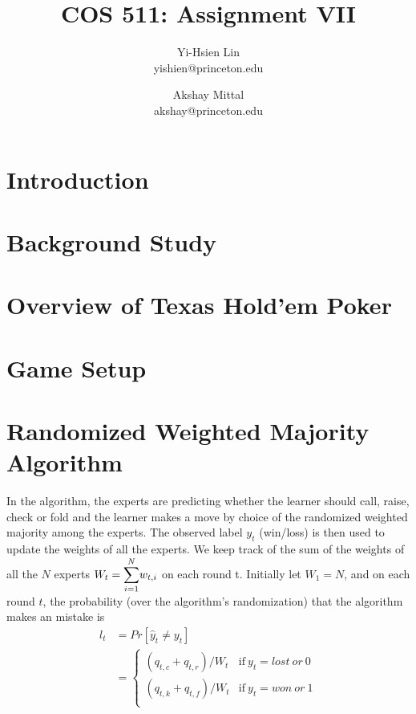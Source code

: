 \documentclass[12pt]{article}
\begin{document}
\title{COS 511: Assignment VII}
\author{
	Yi-Hsien Lin \\ yishien@princeton.edu \and
	Akshay Mittal \\ akshay@princeton.edu
}
\date{}

\maketitle

\section{Introduction}

\section{Background Study}

\section{Overview of Texas Hold'em Poker}

\section{Game Setup}

\section{Randomized Weighted Majority Algorithm}
\label{sec:rwma}
\noindent In the algorithm, the experts are predicting whether the learner should call, raise, check
or fold and the learner makes a move by choice of the randomized weighted majority
among the experts. The observed label $y_t$ (win/loss) is then used to update
the weights of all the experts. We keep track of the sum of the weights of all the $N$ experts $W_t =
\Sum_{i=1}^Nw_{t,i}$ on each round t. Initially let $W_1 = N$, and on each round $t$, the probability
(over the algorithm's randomization) that the algorithm makes an mistake is
\begin{align}
l_t &= Pr[\hat{y}_t\neq y_t]\tag*{}\\
&=\begin{cases}
  	(q_{t,c} + q_{t, r})/W_t & \text{if}~y_{t}=lost~or~0\\
  	(q_{t,k} + q_{t, f})/W_t & \text{if}~y_{t}=won~or~1\\
	\end{cases}\tag*{}
\end{align}
\end{document}
